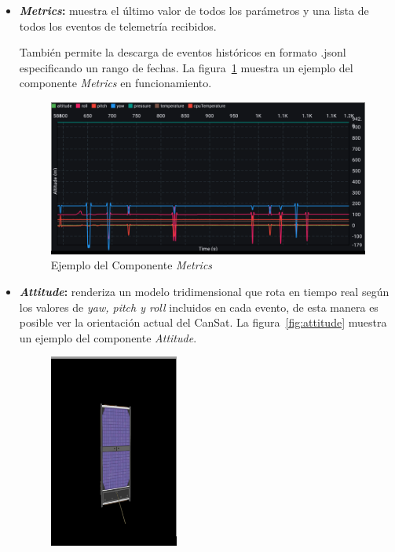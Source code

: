 \begin{itemize}
    \item \textbf{\emph{Metrics}:} muestra el último valor de todos los parámetros y una lista de todos los eventos de telemetría recibidos.

    También permite la descarga de eventos históricos en formato .jsonl especificando un rango de fechas.
    La figura~\ref{fig:metrics} muestra un ejemplo del componente \emph{Metrics} en funcionamiento.
    \begin{figure}[H]
        \centering
        \includegraphics[width=1\textwidth]{Imagenes/Bitmap/metrics}
        \caption{Ejemplo del Componente \emph{Metrics}}
        \label{fig:metrics}
    \end{figure}
    \item \textbf{\emph{Attitude}:} renderiza un modelo tridimensional que rota en tiempo real según los valores de \emph{yaw, pitch y roll} incluidos en cada evento, de esta manera es posible ver la orientación actual del CanSat.
    La figura~\ref{fig:attitude} muestra un ejemplo del componente \emph{Attitude}.
    \begin{figure}[H]
        \centering
        \includegraphics[width=0.4\textwidth]{Imagenes/Bitmap/attitude}

\end{figure}
\end{itemize}
